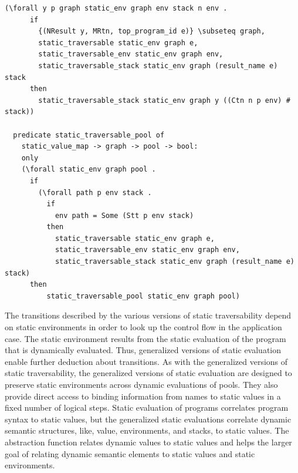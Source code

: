 \documentclass{article}
\begin{document}
\begin{lstlisting}[language=logic, mathescape]
    (\forall y p graph static_env graph env stack n env .
      if 
        {(NResult y, MRtn, top_program_id e)} \subseteq graph,
        static_traversable static_env graph e,
        static_traversable_env static_env graph env,
        static_traversable_stack static_env graph (result_name e) stack 
      then 
        static_traversable_stack static_env graph y ((Ctn n p env) # stack))

  predicate static_traversable_pool of
    static_value_map -> graph -> pool -> bool:
    only
    (\forall static_env graph pool .
      if
        (\forall path p env stack .
          if
            env path = Some (Stt p env stack)
          then 
            static_traversable static_env graph e, 
            static_traversable_env static_env graph env, 
            static_traversable_stack static_env graph (result_name e) stack) 
      then
          static_traversable_pool static_env graph pool)
  \end{lstlisting}

The transitions described by the various versions of static traversability depend on static
environments in order to look up the control flow in the application case.
The static environment
results from the static evaluation of the program that is dynamically evaluated. Thus,
generalized
versions of static evaluation enable further deduction about transitions.
As with the generalized versions of static traversability,
the generalized versions of static evaluation are designed to
preserve static environments across
dynamic evaluations of pools. They also provide direct access to binding information from names
to static values in a fixed number of logical steps. Static evaluation of programs correlates
program syntax to static values, but the generalized static evaluations correlate dynamic
semantic structures, like, value, environments, and stacks, to static values. The abstraction
function relates dynamic values to static values and helps the larger goal of relating dynamic
semantic elements to static values and static environments.    
\end{document}
